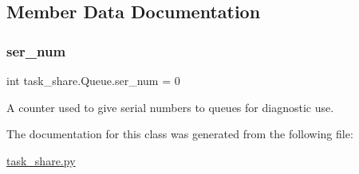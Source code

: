 \subsection{Member Data Documentation}
\mbox{\label{classtask__share_1_1Queue_a6f9d87b116eb16dba0867d3746af9f5f}} 
\subsubsection{\texorpdfstring{ser\+\_\+num}{ser\_num}}
{\footnotesize\ttfamily int task\+\_\+share.\+Queue.\+ser\+\_\+num = 0\hspace{0.3cm}{\ttfamily [static]}}



A counter used to give serial numbers to queues for diagnostic use. 



The documentation for this class was generated from the following file\+:\begin{DoxyCompactItemize}
\item 
\mbox{\hyperlink{task__share_8py}{task\+\_\+share.\+py}}\end{DoxyCompactItemize}

